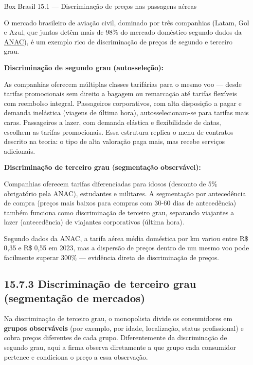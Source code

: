 \documentclass[11pt,twoside,openright]{book}
\begin{document}
\begin{boxbrasilbox}{Box Brasil 15.1 — Discriminação de preços nas passagens aéreas}

O mercado brasileiro de aviação civil, dominado por três companhias
(Latam, Gol e Azul, que juntas detêm mais de 98\% do mercado doméstico
segundo dados da \href{https://www.anac.gov.br}{ANAC}), é um exemplo
rico de discriminação de preços de segundo e terceiro grau.

\textbf{Discriminação de segundo grau (autosseleção):}

As companhias oferecem múltiplas classes tarifárias para o mesmo voo ---
desde tarifas promocionais sem direito a bagagem ou remarcação até
tarifas flexíveis com reembolso integral. Passageiros corporativos, com
alta disposição a pagar e demanda inelástica (viagens de última hora),
autosselecionam-se para tarifas mais caras. Passageiros a lazer, com
demanda elástica e flexibilidade de datas, escolhem as tarifas
promocionais. Essa estrutura replica o menu de contratos descrito na
teoria: o tipo de alta valoração paga mais, mas recebe serviços
adicionais.

\textbf{Discriminação de terceiro grau (segmentação observável):}

Companhias oferecem tarifas diferenciadas para idosos (desconto de 5\%
obrigatório pela ANAC), estudantes e militares. A segmentação por
antecedência de compra (preços mais baixos para compras com 30-60 dias
de antecedência) também funciona como discriminação de terceiro grau,
separando viajantes a lazer (antecedência) de viajantes corporativos
(última hora).

Segundo dados da ANAC, a tarifa aérea média doméstica por km variou
entre R\$ 0,35 e R\$ 0,55 em 2023, mas a dispersão de preços dentro de
um mesmo voo pode facilmente superar 300\% --- evidência direta de
discriminação de preços.

\end{boxbrasilbox}

\subsection{15.7.3 Discriminação de terceiro grau (segmentação de
mercados)}\label{discriminauxe7uxe3o-de-terceiro-grau-segmentauxe7uxe3o-de-mercados}

Na discriminação de terceiro grau, o monopolista divide os consumidores
em \textbf{grupos observáveis} (por exemplo, por idade, localização,
status profissional) e cobra preços diferentes de cada grupo.
Diferentemente da discriminação de segundo grau, aqui a firma observa
diretamente a que grupo cada consumidor pertence e condiciona o preço a
essa observação.
\end{document}
